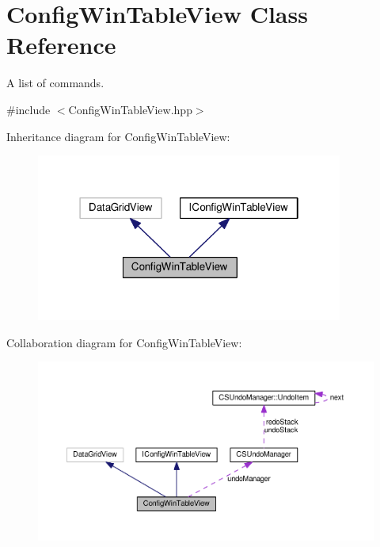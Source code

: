 \hypertarget{classConfigWinTableView}{}\section{Config\+Win\+Table\+View Class Reference}
\label{classConfigWinTableView}


A list of commands.  




{\ttfamily \#include $<$Config\+Win\+Table\+View.\+hpp$>$}



Inheritance diagram for Config\+Win\+Table\+View\+:
\nopagebreak
\begin{figure}[H]
\begin{center}
\leavevmode
\includegraphics[width=286pt]{classConfigWinTableView__inherit__graph}
\end{center}
\end{figure}


Collaboration diagram for Config\+Win\+Table\+View\+:
\nopagebreak
\begin{figure}[H]
\begin{center}
\leavevmode
\includegraphics[width=350pt]{classConfigWinTableView__coll__graph}
\end{center}
\end{figure}
